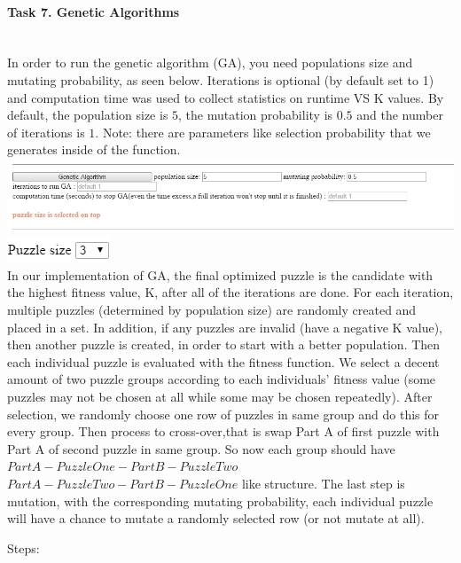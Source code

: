 \documentclass[12pt, letterpaper]{article}
\begin{document}
\pagebreak
\paragraph{Task 7. Genetic Algorithms} \mbox{}\\

In order to run the genetic algorithm (GA), you need populations size and mutating probability, as seen below. Iterations is optional (by default set to 1) and computation time was used to collect statistics on runtime VS K values. By default, the population size is $5$, the mutation probability is $0.5$ and the number of iterations is $1$. Note: there are parameters like selection probability that we generates inside of the function.\\

\includegraphics[scale=0.6]{"Task 7/GA-section"}
\includegraphics[scale=0.6]{"Task 7/Puzzle-size"}\\

In our implementation of GA, the final optimized puzzle is the candidate with the highest fitness value, K, after all of the iterations are done. For each iteration, multiple puzzles (determined by population size) are randomly created and placed in a set. In addition, if any puzzles are invalid (have a negative K value), then another puzzle is created, in order to start with a better population. Then each individual puzzle is evaluated with the fitness function. We select a decent amount of two puzzle groups according to each individuals' fitness value (some puzzles may not be chosen at all while some may be chosen repeatedly). After selection, we randomly choose one row of puzzles in same group and do this for every group. Then process to cross-over,that is swap Part A of first puzzle with Part A of second puzzle in same group. So now each group should have $PartA-PuzzleOne-PartB-PuzzleTwo$ $PartA-PuzzleTwo-PartB-PuzzleOne$ like structure. The last step is mutation, with the corresponding mutating probability, each individual puzzle will have a chance to mutate a randomly selected row (or not mutate at all).

\bigskip
\noindent Steps:
\end{document}
